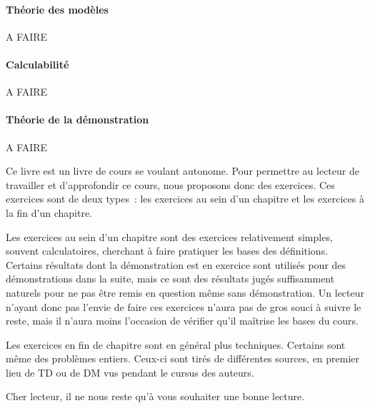 \paragraph{Théorie des modèles}
A FAIRE

\paragraph{Calculabilité}
A FAIRE

\paragraph{Théorie de la démonstration}
A FAIRE

Ce livre est un livre de cours se voulant autonome. Pour permettre au lecteur de
travailler et d'approfondir ce cours, nous proposons donc des exercices. Ces
exercices sont de deux types~: les exercices au sein d'un chapitre et les
exercices à la fin d'un chapitre.

Les exercices au sein d'un chapitre sont des exercices relativement simples,
souvent calculatoires, cherchant à faire pratiquer les bases des définitions.
Certains résultats dont la démonstration est en exercice sont utilisés pour des
démonstrations dans la suite, mais ce sont des résultats jugés suffisamment
naturels pour ne pas être remis en question même sans démonstration. Un lecteur
n'ayant donc pas l'envie de faire ces exercices n'aura pas de gros souci à
suivre le reste, mais il n'aura moins l'occasion de vérifier qu'il maîtrise les
bases du cours.

Les exercices en fin de chapitre sont en général plus techniques. Certains sont
même des problèmes entiers. Ceux-ci sont tirés de différentes sources, en
premier lieu de TD ou de DM vus pendant le cursus des auteurs.

Cher lecteur, il ne nous reste qu'à vous souhaiter une bonne lecture.
